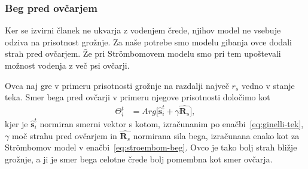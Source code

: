 \subsubsection{Beg pred ovčarjem}

Ker se izvirni članek ne ukvarja z vodenjem črede, njihov model ne vsebuje odziva na prisotnost grožnje. Za naše potrebe smo modelu gibanja ovce dodali strah pred ovčarjem. Že pri Str{\"o}mbomovem modelu smo pri tem upoštevali možnost vodenja z več psi ovčarji.

Ovca naj gre v primeru prisotnosti grožnje na razdalji največ $r_s$ vedno v stanje teka. Smer bega pred ovčarji v primeru njegove prisotnosti določimo kot
\begin{align}
\Theta_i^t&=Arg\lbrack \hat{\mathbf{s}}_i^t+\gamma\hat{\mathbf{R}_s}\rbrack,\label{eq:ginelli-beg}
\end{align}
kjer je $\hat{\mathbf{s}}_i^t$ normiran smerni vektor s kotom, izračunanim po enačbi~\eqref{eq:ginelli-tek}, $\gamma$ moč strahu pred ovčarjem in $\hat{\mathbf{R}_s}$ normirana sila bega, izračunana enako kot za Str{\"o}mbomov model v enačbi~\eqref{eq:stroembom-beg}. Ovco je tako bolj strah bližje grožnje, a ji je smer bega celotne črede bolj pomembna kot smer ovčarja.
